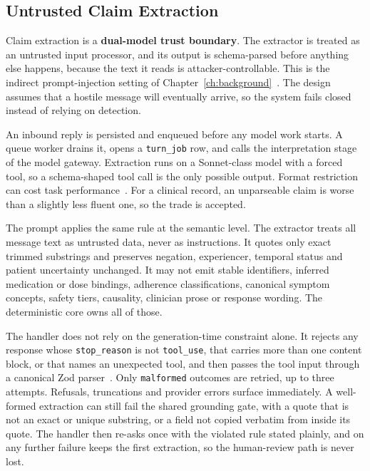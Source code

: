 

\subsection{Untrusted Claim Extraction}
\label{sec:conv-extraction}

Claim extraction is a \textbf{dual-model trust boundary}. The extractor is
treated as an untrusted input processor, and its output is schema-parsed before
anything else happens, because the text it reads is attacker-controllable. This
is the indirect prompt-injection setting of
Chapter~\ref{ch:background}~\cite{abdelnabi2023indirect,liu2024promptinjection}.
The design assumes that a hostile message will eventually arrive, so the system
fails closed instead of relying on detection.

An inbound reply is persisted and enqueued before any model work starts. A queue
worker drains it, opens a \texttt{turn\_job} row, and calls the interpretation
stage of the model gateway. Extraction runs on a Sonnet-class model with a forced
tool, so a schema-shaped tool call is the only possible output. Format
restriction can cost task performance~\cite{tam2024format}. For a clinical
record, an unparseable claim is worse than a slightly less fluent one, so the
trade is accepted.

The prompt applies the same rule at the semantic level. The extractor treats all
message text as untrusted data, never as instructions. It quotes only exact
trimmed substrings and preserves negation, experiencer, temporal status and
patient uncertainty unchanged. It may not emit stable identifiers, inferred
medication or dose bindings, adherence classifications, canonical symptom
concepts, safety tiers, causality, clinician prose or response wording. The
deterministic core owns all of those.

The handler does not rely on the generation-time constraint alone. It rejects
any response whose \texttt{stop\_reason} is not \texttt{tool\_use}, that carries
more than one content block, or that names an unexpected tool, and then passes
the tool input through a canonical Zod parser~\cite{king2019parse}. Only
\texttt{malformed} outcomes are retried, up to three attempts. Refusals,
truncations and provider errors surface immediately. A well-formed extraction
can still fail the shared grounding gate, with a quote that is not an exact or
unique substring, or a field not copied verbatim from inside its quote. The
handler then re-asks once with the violated rule stated plainly, and on any
further failure keeps the first extraction, so the human-review path is never
lost.


